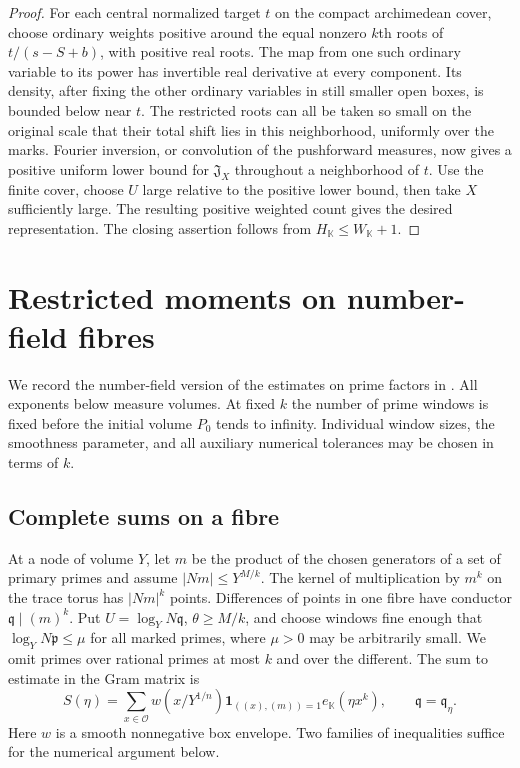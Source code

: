 \documentclass[11pt,letterpaper]{article}
\theoremstyle{definition}
\numberwithin{equation}{section}
\begin{document}
\begin{proof}
For each central normalized target $t$ on the compact archimedean
cover, choose ordinary weights positive around the equal nonzero
$k$th roots of $t/(s-S+b)$, with positive real roots. The map
from one such ordinary variable to its power has invertible real
derivative at every component. Its density, after fixing the other
ordinary variables in still smaller open boxes, is bounded below
near $t$. The restricted roots can all be taken so small on the
original scale that their total shift lies in this neighborhood,
uniformly over the marks. Fourier inversion, or convolution of the
pushforward measures, now gives a positive uniform lower bound
for $\mathfrak J_X$ throughout a neighborhood of $t$. Use the
finite cover, choose $U$ large relative to the positive lower bound,
then take $X$ sufficiently large. The resulting positive weighted
count gives the desired representation. The closing assertion
follows from $H_{\mathbb K}\le W_{\mathbb K}+1$.
\end{proof}

\section{Restricted moments on number-field fibres}\label{sec:nf-fibres}
We record the number-field version of the estimates on prime factors in
\cite[Sections~3--5]{NFChow}. All exponents below measure volumes.
At fixed $k$ the number of prime windows is fixed before the initial
volume $P_0$ tends to infinity. Individual window sizes, the
smoothness parameter, and all auxiliary numerical tolerances may be
chosen in terms of $k$.

\subsection{Complete sums on a fibre}
At a node of volume $Y$, let $m$ be the product of the chosen generators
of a set of primary primes and assume $|Nm|\le Y^{M/k}$.
The kernel of multiplication by $m^k$ on the trace torus has
$|Nm|^k$ points. Differences of points in one fibre have conductor
$\mathfrak q\mid(m)^k$. Put $U=\log_Y N\mathfrak q$,
$\theta\ge M/k$, and choose windows fine enough that
$\log_Y N\mathfrak p\le\mu$ for all marked primes, where
$\mu>0$ may be arbitrarily small. We omit primes over rational
primes at most $k$ and over the different. The sum to estimate in the
Gram matrix is
\[
 S(\eta)=\sum_{x\in\mathcal O}w(x/Y^{1/n})
            \mathbf1_{((x),(m))=1} e_{\mathbb K}(\eta x^k),
 \qquad \mathfrak q=\mathfrak q_\eta.
\]
Here $w$ is a smooth nonnegative box envelope. Two families of
inequalities suffice for the numerical argument below.
\end{document}
